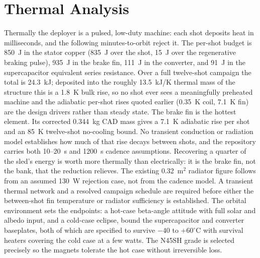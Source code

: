 \documentclass[conference]{IEEEtran}
\begin{document}
\section{Thermal Analysis}\label{sec:thermal}
Thermally the deployer is a pulsed, low-duty machine: each shot deposits heat in milliseconds, and the following minutes-to-orbit reject it. The per-shot budget is 850~J in the stator copper (835~J over the shot, 15~J over the regenerative braking pulse), 935~J in the brake fin, 111~J in the converter, and 91~J in the supercapacitor equivalent series resistance. Over a full twelve-shot campaign the total is 24.3~kJ; deposited into the roughly 13.5~kJ/K thermal mass of the structure this is a 1.8~K bulk rise, so no shot ever sees a meaningfully preheated machine and the adiabatic per-shot rises quoted earlier (0.35~K coil, 7.1~K fin) are the design drivers rather than steady state. The brake fin is the hottest element. Its corrected 0.344~kg CAD mass gives a 7.1~K adiabatic rise per shot and an 85~K twelve-shot no-cooling bound. No transient conduction or radiation model establishes how much of that rise decays between shots, and the repository carries both 10--20~s and 1200~s cadence assumptions. Recovering a quarter of the sled's energy is worth more thermally than electrically: it is the brake fin, not the bank, that the reduction relieves. The existing 0.32~m$^2$ radiator figure follows from an assumed 130~W rejection case, not from the cadence model. A transient thermal network and a resolved campaign schedule are required before either the between-shot fin temperature or radiator sufficiency is established. The orbital environment sets the endpoints: a hot-case beta-angle attitude with full solar and albedo input, and a cold-case eclipse, bound the supercapacitor and converter baseplates, both of which are specified to survive $-40$ to $+60^\circ$C with survival heaters covering the cold case at a few watts. The N45SH grade is selected precisely so the magnets tolerate the hot case without irreversible loss.
\end{document}
